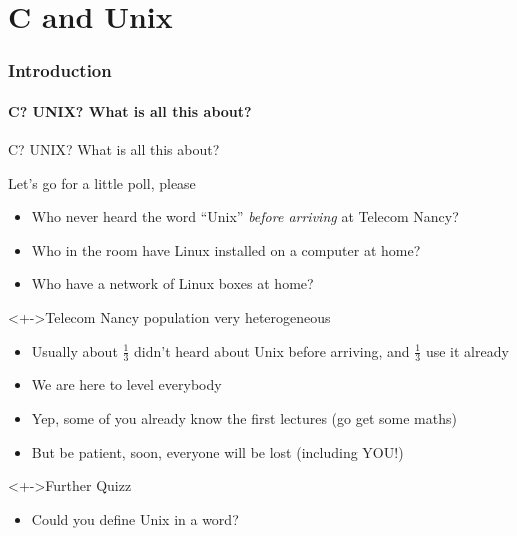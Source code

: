 \part{C and Unix}\toc
\section{Introduction}
\subsection{C? UNIX? What is all this about?}
\begin{frame}{C? UNIX? What is all this about?}
  \begin{block}{Let's go for a little poll, please}
    \begin{itemize}
    \item<+-> Who never heard the word ``Unix'' \textit{before arriving} at
      Telecom Nancy?
    \item<+-> Who in the room have Linux installed on a computer at home?
    \item<+-> Who have a network of Linux boxes at home?
    \end{itemize}
  \end{block}

  \begin{block}<+->{Telecom Nancy population very heterogeneous}
    \begin{itemize}
    \item Usually about $\frac{1}{3}$ didn't heard about Unix before arriving,
      and $\frac{1}{3}$ use it already
    \item We are here to level everybody
    \item Yep, some of you already know the first lectures
      {\small(go get some maths)}
    \item But be patient, soon, everyone will be lost (including YOU!)
    \end{itemize}
  \end{block}

  \begin{block}<+->{Further Quizz}
    \begin{itemize}
    \item Could you define Unix in a word? 
    \end{itemize}
  \end{block}
\end{frame}
